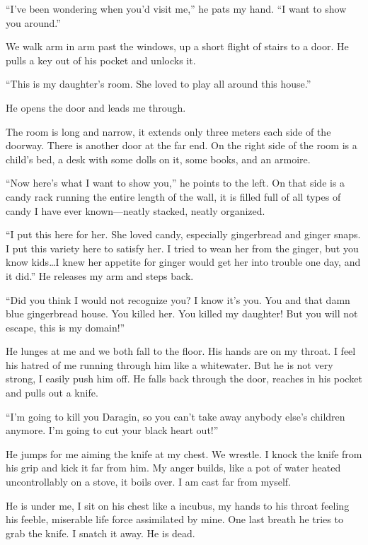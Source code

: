\documentclass[
]{article}
\begin{document}
``I've been wondering when you'd visit me,'' he pats my hand. ``I want
to show you around.''

We walk arm in arm past the windows, up a short flight of stairs to a
door. He pulls a key out of his pocket and unlocks it.

``This is my daughter's room. She loved to play all around this house.''

He opens the door and leads me through.

The room is long and narrow, it extends only three meters each side of
the doorway. There is another door at the far end. On the right side of
the room is a child's bed, a desk with some dolls on it, some books, and
an armoire.

``Now here's what I want to show you,'' he points to the left. On that
side is a candy rack running the entire length of the wall, it is filled
full of all types of candy I have ever known---neatly stacked, neatly
organized.

``I put this here for her. She loved candy, especially gingerbread and
ginger snaps. I put this variety here to satisfy her. I tried to wean
her from the ginger, but you know kids\ldots I knew her appetite for
ginger would get her into trouble one day, and it did.'' He releases my
arm and steps back.

``Did you think I would not recognize you? I know it's you. You and that
damn blue gingerbread house. You killed her. You killed my daughter! But
you will not escape, this is my domain!''

He lunges at me and we both fall to the floor. His hands are on my
throat. I feel his hatred of me running through him like a whitewater.
But he is not very strong, I easily push him off. He falls back through
the door, reaches in his pocket and pulls out a knife.

``I'm going to kill you Daragin, so you can't take away anybody else's
children anymore. I'm going to cut your black heart out!''

He jumps for me aiming the knife at my chest. We wrestle. I knock the
knife from his grip and kick it far from him. My anger builds, like a
pot of water heated uncontrollably on a stove, it boils over. I am cast
far from myself.

He is under me, I sit on his chest like a incubus, my hands to his
throat feeling his feeble, miserable life force assimilated by mine. One
last breath he tries to grab the knife. I snatch it away. He is dead.
\end{document}
